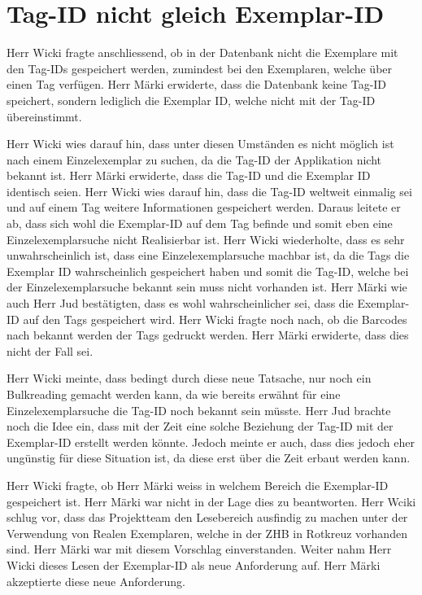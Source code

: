 \documentclass[parskip=full, a4paper]{scrreprt}
\begin{document}
\section{Tag-ID nicht gleich Exemplar-ID}
\label{result:noSingleTagReachable}
Herr Wicki fragte anschliessend, ob in der Datenbank nicht die Exemplare mit den Tag-IDs gespeichert werden, zumindest bei den Exemplaren, welche über einen Tag verfügen. Herr Märki erwiderte, dass die Datenbank keine Tag-ID speichert, sondern lediglich die Exemplar ID, welche nicht mit der Tag-ID übereinstimmt.

Herr Wicki wies darauf hin, dass unter diesen Umständen es nicht möglich ist nach einem Einzelexemplar zu suchen, da die Tag-ID der Applikation nicht bekannt ist. Herr Märki erwiderte, dass die Tag-ID und die Exemplar ID identisch seien. Herr Wicki wies darauf hin, dass die Tag-ID weltweit einmalig sei und auf einem Tag weitere Informationen gespeichert werden. Daraus leitete er ab, dass sich wohl die Exemplar-ID auf dem Tag befinde und somit eben eine Einzelexemplarsuche nicht Realisierbar ist. Herr Wicki wiederholte, dass es sehr unwahrscheinlich ist, dass eine Einzelexemplarsuche machbar ist, da die Tags die Exemplar ID wahrscheinlich gespeichert haben und somit die Tag-ID, welche bei der Einzelexemplarsuche bekannt sein muss nicht vorhanden ist. Herr Märki wie auch Herr Jud bestätigten, dass es wohl wahrscheinlicher sei, dass die Exemplar-ID auf den Tags gespeichert wird. Herr Wicki fragte noch nach, ob die Barcodes nach bekannt werden der Tags gedruckt werden. Herr Märki erwiderte, dass dies nicht der Fall sei.

Herr Wicki meinte, dass bedingt durch diese neue Tatsache, nur noch ein Bulkreading gemacht werden kann, da wie bereits erwähnt für eine Einzelexemplarsuche die Tag-ID noch bekannt sein müsste. Herr Jud brachte noch die Idee ein, dass mit der Zeit eine solche Beziehung der Tag-ID mit der Exemplar-ID erstellt werden könnte. Jedoch meinte er auch, dass dies jedoch eher ungünstig für diese Situation ist, da diese erst über die Zeit erbaut werden kann.

Herr Wicki fragte, ob Herr Märki weiss in welchem Bereich die Exemplar-ID gespeichert ist. Herr Märki war nicht in der Lage dies zu beantworten. Herr Wciki schlug vor, dass das Projektteam den Lesebereich ausfindig zu machen unter der Verwendung von Realen Exemplaren, welche in der ZHB in Rotkreuz vorhanden sind. Herr Märki war mit diesem Vorschlag einverstanden. Weiter nahm Herr Wicki dieses Lesen der Exemplar-ID als neue Anforderung auf. Herr Märki akzeptierte diese neue Anforderung.
\end{document}
